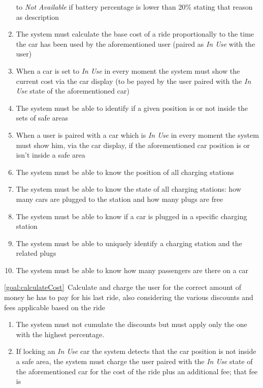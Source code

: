 \begin{description}
\begin{enumerate}[resume*]
  				to \emph{Not Available} if battery percentage is lower than 20\%  stating that reason
  				as description
  				\item The system must calculate the base cost of a ride proportionally to the time
  				the car has been used by the aforementioned user (paired as \emph{In Use} with the
  				user)
  				\item When a car is set to \emph{In Use} in every moment the system must show the
  				current cost via the car display (to be payed by the user paired with the \emph{In Use}
  				state of the aforementioned car) 
  				\item The system must be able to identify if a given position is or not inside the sets
  				of safe areas
  				\item When a user is paired with a car which is \emph{In Use} in every moment the
  				system must show him, via the car display, if the aforementioned car position is or
  				isn't inside a safe area
  				\item The system must be able to know the position of all charging stations
  				\item The system must be able to know the state of all charging stations: how many
  				cars are plugged to the station and how many plugs are free 
  				\item The system must be able to know if a car is plugged in a specific charging
  				station
  				\item The system must be able to uniquely identify a charging station and the related
  				plugs
  				\item The system must be able to know how many passengers are there on a car	
   			\end{enumerate}
  		\item \ref{goal:calculateCost}\ Calculate and charge the user for the correct amount of money he has to pay for his last ride, also considering the various discounts and fees applicable based on the ride
  			\begin{enumerate}[resume*]
  			    \item The system must not cumulate the discounts but must apply only the one with the
  			    highest percentage.
  				\item If locking an \emph{In Use} car the system detects that the car position is not
  				inside a safe area, the system must charge the user paired with the \emph{In Use} state
  				of the aforementioned car for the cost of the ride plus an additional fee; that fee is

\end{enumerate}
\end{description}
